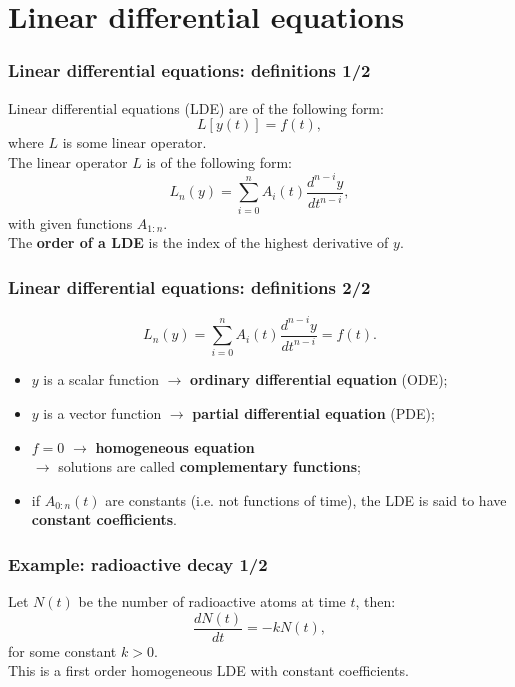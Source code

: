 \section{Linear differential equations}

\begin{frame}
\frametitle{Linear differential equations: definitions 1/2}
Linear differential equations (LDE) are of the following form:
\begin{equation*}
L[y(t)] = f(t),
\end{equation*}
where $L$ is some linear operator. \\
The linear operator $L$ is of the following form:
\begin{equation*}
L_n(y) = \sum_{i=0}^{n} A_i(t) \frac{d^{n-i}y}{dt^{n-i}},
\end{equation*}
with given functions $A_{1:n}$.\\
The \textbf{order of a LDE} is the index of the highest derivative of $y$.
\end{frame}

\begin{frame}
\frametitle{Linear differential equations: definitions 2/2}
\begin{equation*}
L_n(y) = \sum_{i=0}^{n} A_i(t) \frac{d^{n-i}y}{dt^{n-i}} = f(t).
\end{equation*}
\begin{itemize}
\item $y$ is a scalar function $\rightarrow$ \textbf{ordinary differential equation} (ODE);
\item $y$ is a vector function $\rightarrow$ \textbf{partial differential equation} (PDE); \\
\item $f = 0$ $\rightarrow$ \textbf{homogeneous equation} \\
$\rightarrow$ solutions are called \textbf{complementary functions}; \\
\item if $A_{0:n}(t)$ are constants (i.e. not functions of time), the LDE is said to have \textbf{constant coefficients}.
\end{itemize}
\end{frame}

\begin{frame}
\frametitle{Example: radioactive decay 1/2}
Let $N(t)$ be the number of radioactive atoms at time $t$, then:
\begin{equation*}
\frac{dN(t)}{dt} = - k N(t),
\end{equation*}
for some constant $k>0$. \\
\vspace{1em}
This is a first order homogeneous LDE with constant coefficients.
\end{frame}

